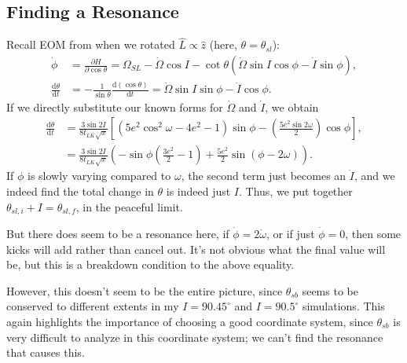 \documentclass[11pt,
        usenames, %
        dvipsnames %
    ]{article}
\newcommand*{\rd}[2]{\frac{\mathrm{d}#1}{\mathrm{d}#2}}
\newcommand*{\pd}[2]{\frac{\partial#1}{\partial#2}}
\newcommand*{\p}[1]{\left(#1\right)}
\newcommand*{\s}[1]{\left[#1\right]}
\begin{document}
\subsection{Finding a Resonance}

Recall EOM from when we rotated $\hat{L} \propto \hat{z}$ (here, $\theta =
\theta_{sl}$):
\begin{align}
    \dot{\phi} &= \pd{H}{\cos \theta} = \Omega_{SL} - \dot{\Omega}\cos I
        - \cot \theta\p{\dot{\Omega} \sin I \cos \phi - \dot{I}\sin \phi},\\
    \rd{\theta}{t} &= -\frac{1}{\sin \theta}\rd{(\cos \theta)}{t}
        = \dot{\Omega}\sin I \sin \phi - \dot{I}\cos \phi.
\end{align}
If we directly substitute our known forms for $\dot{\Omega}$ and $\dot{I}$, we
obtain
\begin{align}
    \rd{\theta}{t}
        &= \frac{3\sin 2I}{8t_{LK}\sqrt{x}}\s{
            \p{5e^2\cos^2 \omega - 4e^2 - 1}\sin \phi
            - \p{\frac{5e^2\sin 2\omega}{2}}\cos \phi},\\
        &= \frac{3\sin 2I}{8t_{LK}\sqrt{x}}\p{
            -\sin \phi\p{\frac{3e^2}{2} - 1}
                + \frac{5e^2}{2}\sin\p{\phi - 2\omega}}.
\end{align}
If $\phi$ is slowly varying compared to $\omega$, the second term just becomes
an $\dot{I}$, and we indeed find the total change in $\theta$ is indeed just
$I$. Thus, we put together $\theta_{sl,i} + I = \theta_{sl, f}$, in the peaceful
limit.

But there does seem to be a resonance here, if $\dot{\phi} = 2\dot{\omega}$, or
if just $\dot{\phi} = 0$, then some kicks will add rather than cancel out. It's
not obvious what the final value will be, but this is a breakdown condition to
the above equality.

However, this doesn't seem to be the entire picture, since $\theta_{sb}$ seems
to be conserved to different extents in my $I = 90.45^\circ$ and $I =
90.5^\circ$ simulations. This again highlights the importance of choosing a good
coordinate system, since $\theta_{sb}$ is very difficult to analyze in this
coordinate system; we can't find the resonance that causes this.
\end{document}
